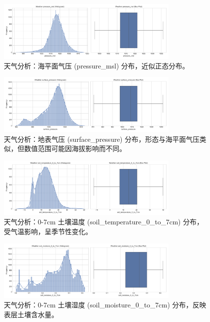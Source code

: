 \documentclass{article} %
\begin{document}
\begin{figure}[H]
    \centering
    \includegraphics[width=0.8\textwidth]{../plots/weather_distribution_pressure_msl.png}
    \caption{天气分析：海平面气压 (pressure\_msl) 分布，近似正态分布。} %
    \label{fig:weather_dist_pressure_msl}
\end{figure}

\begin{figure}[H]
    \centering
    \includegraphics[width=0.8\textwidth]{../plots/weather_distribution_surface_pressure.png}
    \caption{天气分析：地表气压 (surface\_pressure) 分布，形态与海平面气压类似，但数值范围可能因海拔影响而不同。} %
    \label{fig:weather_dist_surface_pressure}
\end{figure}

\begin{figure}[H]
    \centering
    \includegraphics[width=0.8\textwidth]{../plots/weather_distribution_soil_temperature_0_to_7cm.png}
    \caption{天气分析：0-7cm 土壤温度 (soil\_temperature\_0\_to\_7cm) 分布，受气温影响，呈季节性变化。} %
    \label{fig:weather_dist_soil_temp}
\end{figure}

\begin{figure}[H]
    \centering
    \includegraphics[width=0.8\textwidth]{../plots/weather_distribution_soil_moisture_0_to_7cm.png}
    \caption{天气分析：0-7cm 土壤湿度 (soil\_moisture\_0\_to\_7cm) 分布，反映表层土壤含水量。} %
    \label{fig:weather_dist_soil_moisture}
\end{figure}
\end{document}
